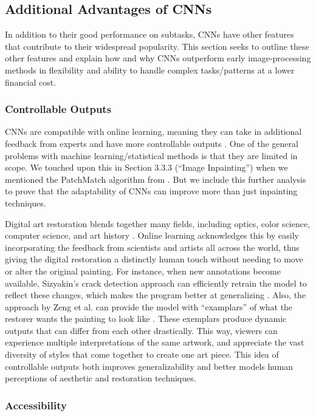 \documentclass[a4paper,11pt]{article}
\begin{document}
\subsection{Additional Advantages of CNNs}

In addition to their good performance on subtasks, CNNs have other features that contribute to their widespread popularity. This section seeks to outline these other features and explain how and why CNNs outperform early image-processing methods in flexibility and ability to handle complex tasks/patterns at a lower financial cost. 

\subsubsection{Controllable Outputs}

CNNs are compatible with online learning, meaning they can take in additional feedback from experts and have more controllable outputs \cite{zenggongzeng}\cite{sizyakin}. One of the general problems with machine learning/statistical methods is that they are limited in scope. We touched upon this in Section 3.3.3 (“Image Inpainting”) when we mentioned the PatchMatch algorithm from \cite{barnes}. But we include this further analysis to prove that the adaptability of CNNs can improve more than just inpainting techniques. 

Digital art restoration blends together many fields, including optics, color science, computer science, and art history \cite{barni2005}. Online learning acknowledges this by easily incorporating the feedback from scientists and artists all across the world, thus giving the digital restoration a distinctly human touch without needing to move or alter the original painting. For instance, when new annotations become available, Sizyakin’s crack detection approach can efficiently retrain the model to reflect these changes, which makes the program better at generalizing \cite{sizyakin}. Also, the approach by Zeng et al. can provide the model with “examplars” of what the restorer wants the painting to look like \cite{zenggongzeng}. These exemplars produce dynamic outputs that can differ from each other drastically. This way, viewers can experience multiple interpretations of the same artwork, and appreciate the vast diversity of styles that come together to create one art piece. This idea of controllable outputs both improves generalizability and better models human perceptions of aesthetic and restoration techniques.

\subsubsection{Accessibility}
\end{document}

